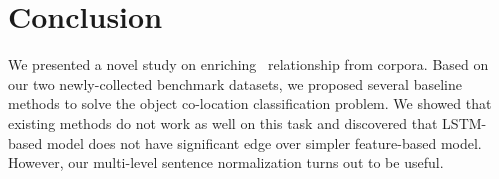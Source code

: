 \section{Conclusion}
We presented a novel study on enriching \lnear\ relationship from corpora. 
Based on our two newly-collected benchmark datasets, we proposed several baseline methods to solve 
the object co-location classification problem. 
We showed that existing methods do not work as well on this task and discovered that LSTM-based model does not have significant edge over 
simpler feature-based model. However, our multi-level sentence normalization turns out to be useful. %
